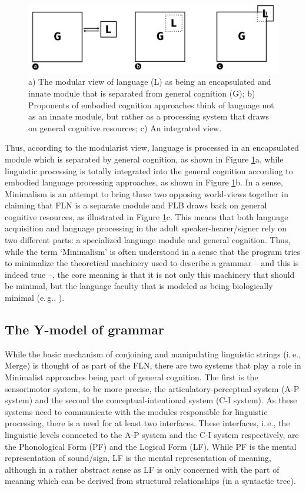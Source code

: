 \begin{figure}[bt]
\centering
	\includegraphics[width=1.0\textwidth]{modelsw.jpg}
	\caption{a) The modular view of language (L) as being an encapsulated and innate module that is separated from general cognition (G); b) Proponents of embodied cognition approaches think of language not as an innate module, but rather as a processing system that draws on general cognitive resources; c) An integrated view.}
	\label{model}
\end{figure}

Thus, according to the modularist view, language is processed in an encapsulated module which is separated by general cognition, as shown in Figure \ref{model}a, while linguistic processing is totally integrated into the general cognition according to embodied language processing approaches, as shown in Figure \ref{model}b.  In a sense, Minimalism is an attempt to bring these two opposing world-views together in claiming that FLN is a separate module and FLB draws back on general cognitive resources, as illustrated in Figure \ref{model}c. This means that both language acquisition and language processing in the adult speaker-hearer/signer rely on two different parts: a specialized language module and general cognition. Thus, while the term `Minimalism' is often understood in a sense that the program tries to minimalize the theoretical machinery used to describe a grammar -- and this is indeed true --, the core meaning is that it is not only this machinery that should be minimal, but the language faculty that is modeled as being biologically minimal (e.\,g., \citealt{sigurdsson2011uniformity}).

\subsection{The Y-model of grammar}
While the basic mechanism of conjoining and manipulating linguistic strings (i.\,e., Merge) is thought of as part of the FLN, there are two systems that play a role in Minimalist approaches being part of general cognition. The first is the sensorimotor system, to be more precise, the articulatory-perceptual system (A-P system) and the second the conceptual-intentional system (C-I system). As these systems need to communicate with the modules responsible for linguistic processing, there is a need for at least two interfaces. These interfaces, i.\,e., the linguistic levels connected to the A-P system and the C-I system respectively, are the Phonological Form (PF) and the Logical Form (LF). While PF is the mental representation of sound/sign, LF is the mental representation of meaning, although in a rather abstract sense as LF is only concerned with the part of meaning which can be derived from structural relationships (in a syntactic tree).
 
